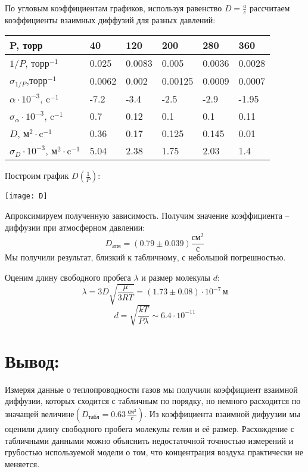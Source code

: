 \documentclass[a4paper,12pt]{article}
\begin{document}
		По угловым коэффициентам графиков, используя равенство $D = \frac{a}{c}$ рассчитаем коэффициенты взаимных диффузий для разных давлений:
		\begin{center}
			\begin{tabular}{  l | l  p{1.5cm}  l  l  p{1.5cm}}
				P, торр                                & 40 & 120 & 200 & 280 & 360 \\ \hline
				$1/P$, торр$^{-1}$                     & 0.025 & 0.0083 & 0.005 & 0.0036 & 0.0028 \\ \hline
				$\sigma_{1/P}$,торр$^{-1}$             & 0.0062 & 0.002 & 0.00125 & 0.0009 & 0.0007 \\ \hline
				$\alpha\cdot 10^{-3}$, c$^{-1}$        & -7.2 & -3.4 & -2.5 & -2.9 & -1.95 \\ \hline
				$\sigma_{\alpha}\cdot 10^{-3}$, c$^{-1}$ & 0.7 & 0.12 & 0.1 & 0.1 & 0.11 \\ \hline
				$D$, м$^2\cdot$c$^{-1}$                & 0.36 & 0.17 & 0.125 & 0.145 &  0.01 \\ \hline
				$\sigma_D\cdot 10^{-3}$, м$^2\cdot$c$^{-1}$ & 5.04 & 2.38 & 1.75 & 2.03 & 1.4 \\ \hline
			\end{tabular}
		\end{center}
		
		Построим график $D(\frac{1}{P})$:
		
		\texttt{[image: D]}
		
		Апроксимируем полученную зависимость. Получим значение коэффициента -- диффузии при атмосферном давлении:
		\[
		D_{\text{атм}} = \left(0.79\pm 0.039\right)\frac{\text{см}^2}{\text{с}}
		\]
		Мы получили результат, близкий к табличному, с небольшой погрешностью.
		
		Оценим длину свободного пробега $\lambda$ и размер молекулы $d$:
		\[
		\lambda = 3D \sqrt{\frac{\mu}{3RT}} = \left(1.73 \pm 0.08\right)\cdot 10^{-7}\, \text{м}
		\]
		\[
		d = \sqrt{\frac{kT}{P\lambda}} \sim 6.4\cdot 10^{-11}
		\]
	\section{Вывод:}
		Измеряя данные о теплопроводности газов мы получили коэффициент взаимной диффузии, которых сходится с табличным по порядку, но немного расходится по значащей величине$ \left( D_{\text{табл}}=0.63 \,\frac{\text{см}^2}{\text{с}} \right)$. Из коэффициента взаимной дифуузии мы оценили длину свободного пробега молекулы гелия и её размер. Расхождение с табличными данными можно объяснить недостаточной точностью измерений и грубостью используемой модели о том, что концентрация воздуха практически не меняется.
\end{document}
